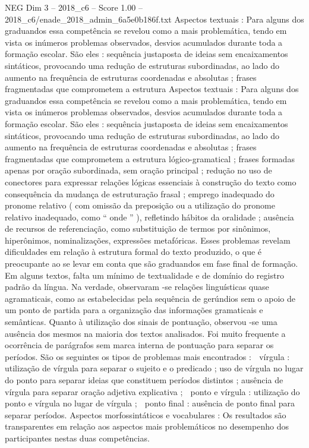 \begin{textsample}{NEG Dim 3 – 2018\_c6 – Score 1.00 – 2018\_c6/enade\_2018\_admin\_6a5e0b186f.txt}
Aspectos textuais : Para alguns dos graduandos essa competência se revelou como a mais problemática, tendo em vista os inúmeros problemas observados, desvios acumulados durante toda a formação escolar.
São eles : sequência justaposta de ideias sem encaixamentos sintáticos, provocando uma redução de estruturas subordinadas, ao lado do aumento na frequência de estruturas coordenadas e absolutas ; frases fragmentadas que comprometem a estrutura Aspectos textuais : Para alguns dos graduandos essa competência se revelou como a mais problemática, tendo em vista os inúmeros problemas observados, desvios acumulados durante toda a formação escolar.
São eles : sequência justaposta de ideias sem encaixamentos sintáticos, provocando uma redução de estruturas subordinadas, ao lado do aumento na frequência de estruturas coordenadas e absolutas ; frases fragmentadas que comprometem a estrutura lógico-gramatical ; frases formadas apenas por oração subordinada, sem oração principal ; redução no uso de conectores para expressar relações lógicas essenciais à construção do texto como consequência da mudança de estruturação frasal ; emprego inadequado do pronome relativo ( com omissão da preposição ou a utilização do pronome relativo inadequado, como “ onde ” ), refletindo hábitos da oralidade ; ausência de recursos de referenciação, como substituição de termos por sinônimos, hiperônimos, nominalizações, expressões metafóricas.
Esses problemas revelam dificuldades em relação à estrutura formal do texto produzido, o que é preocupante ao se levar em conta que são graduandos em fase final de formação.
Em alguns textos, falta um mínimo de textualidade e de domínio do registro padrão da língua.
Na verdade, observaram -se relações linguísticas quase agramaticais, como as estabelecidas pela sequência de gerúndios sem o apoio de um ponto de partida para a organização das informações gramaticais e semânticas.
Quanto à utilização dos sinais de pontuação, observou -se uma ausência dos mesmos na maioria dos textos analisados.
Foi muito frequente a ocorrência de parágrafos sem marca interna de pontuação para separar os períodos.
São os seguintes os tipos de problemas mais encontrados :  vírgula : utilização de vírgula para separar o sujeito e o predicado ; uso de vírgula no lugar do ponto para separar ideias que constituem períodos distintos ; ausência de vírgula para separar oração adjetiva explicativa ;  ponto e vírgula : utilização do ponto e vírgula no lugar de vírgula ;  ponto final : ausência de ponto final para separar períodos.
Aspectos morfossintáticos e vocabulares : Os resultados são transparentes em relação aos aspectos mais problemáticos no desempenho dos participantes nestas duas competências.

\end{textsample}
